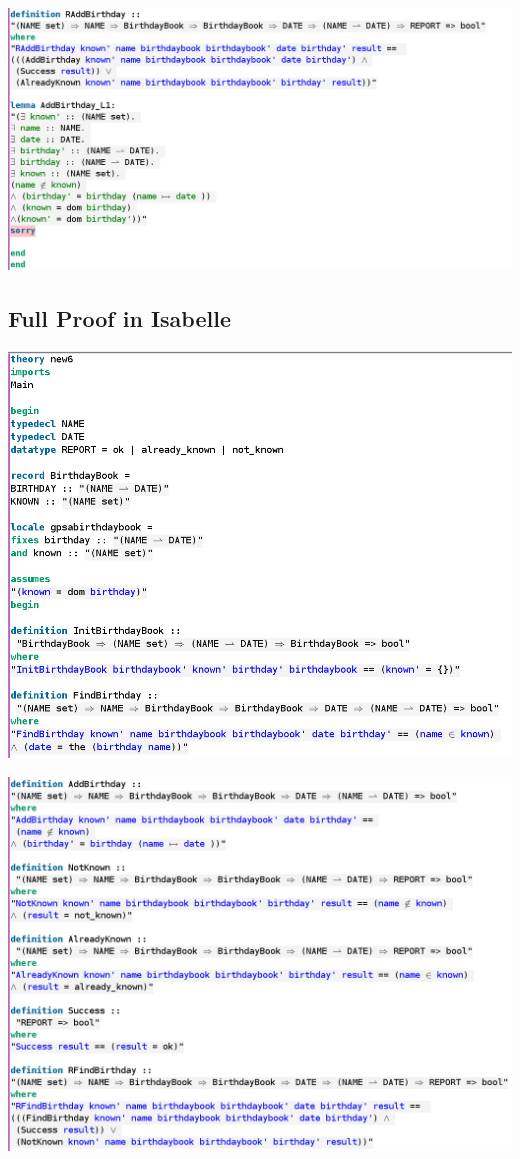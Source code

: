 \noindent \includegraphics[scale=0.4]{examples/bb/5imagec.png}
%
%
\subsection{Full Proof in Isabelle}
\label{app:bb6}
\includegraphics[scale=0.4]{examples/bb/6imagea.png}

\noindent \includegraphics[scale=0.4]{examples/bb/6imageb.png}

